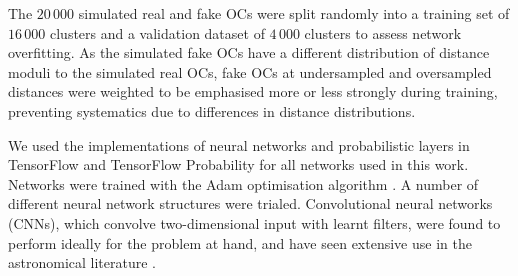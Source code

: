 The $20\,000$ simulated real and fake OCs were split randomly into a training set of $16\,000$ clusters and a validation dataset of $4\,000$ clusters to assess network overfitting. As the simulated fake OCs have a different distribution of distance moduli to the simulated real OCs, fake OCs at undersampled and oversampled distances were weighted to be emphasised more or less strongly during training, preventing systematics due to differences in distance distributions.

We used the implementations of neural networks and probabilistic layers in TensorFlow \citep{abadi_tensorflow_2015, abadi_tensorflow_2016} and TensorFlow Probability \citep{dillon_tensorflow_2017} for all networks used in this work. Networks were trained with the Adam optimisation algorithm \citep{kingma_adam_2017}. A number of different neural network structures were trialed. Convolutional neural networks (CNNs), which convolve two-dimensional input with learnt filters, were found to perform ideally for the problem at hand, and have seen extensive use in the astronomical literature \cite[e.g.][]{castro-ginard_hunting_2022, becker_cnn_2021, killestein_transient-optimised_2021}.

